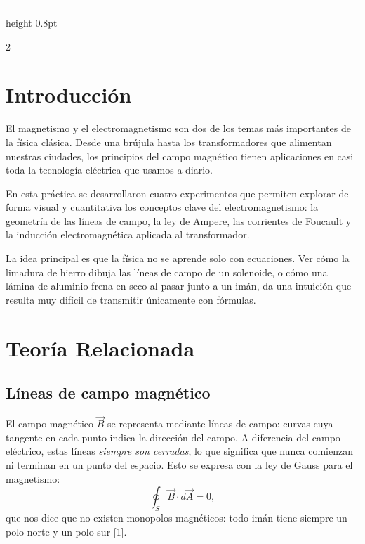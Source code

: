 \documentclass[10pt]{article}
\begin{document}
\vspace{6pt}
\hrule height 0.8pt
\vspace{5pt}

\begin{multicols}{2}

\section{Introducción}

El magnetismo y el electromagnetismo son dos de los temas más importantes de la física clásica. Desde una brújula hasta los transformadores que alimentan nuestras ciudades, los principios del campo magnético tienen aplicaciones en casi toda la tecnología eléctrica que usamos a diario.

En esta práctica se desarrollaron cuatro experimentos que permiten explorar de forma visual y cuantitativa los conceptos clave del electromagnetismo: la geometría de las líneas de campo, la ley de Ampere, las corrientes de Foucault y la inducción electromagnética aplicada al transformador.

La idea principal es que la física no se aprende solo con ecuaciones. Ver cómo la limadura de hierro dibuja las líneas de campo de un solenoide, o cómo una lámina de aluminio frena en seco al pasar junto a un imán, da una intuición que resulta muy difícil de transmitir únicamente con fórmulas.

\section{Teoría Relacionada}

\subsection*{Líneas de campo magnético}

El campo magnético $\vec{B}$ se representa mediante líneas de campo: curvas cuya tangente en cada punto indica la dirección del campo. A diferencia del campo eléctrico, estas líneas \emph{siempre son cerradas}, lo que significa que nunca comienzan ni terminan en un punto del espacio. Esto se expresa con la ley de Gauss para el magnetismo:
\begin{equation}
    \oint_S \vec{B}\cdot d\vec{A} = 0,
    \label{eq:gauss_mag}
\end{equation}
que nos dice que no existen monopolos magnéticos: todo imán tiene siempre un polo norte y un polo sur [1].


\end{multicols}
\end{document}
